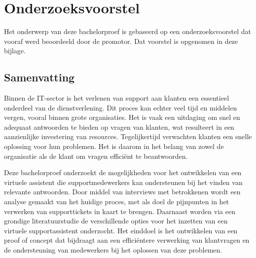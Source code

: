 \documentclass[dutch,dit,thesis]{hogentreport}
\begin{document}












\appendix

\chapter{Onderzoeksvoorstel}

Het onderwerp van deze bachelorproef is gebaseerd op een onderzoeksvoorstel dat vooraf werd beoordeeld door de promotor. Dat voorstel is opgenomen in deze bijlage.
 
\section*{Samenvatting}

 Binnen de IT-sector is het verlenen van support aan klanten een essentieel onderdeel van de dienstverlening. Dit proces kan echter veel tijd en middelen vergen, vooral binnen grote organisaties. Het is vaak een uitdaging om snel en adequaat antwoorden te bieden op vragen van klanten, wat resulteert in een aanzienlijke investering van resources. Tegelijkertijd verwachten klanten een snelle oplossing voor hun problemen. Het is daarom in het belang van zowel de organisatie als de klant om vragen efficiënt te beantwoorden.

Deze bachelorproef onderzoekt de mogelijkheden voor het ontwikkelen van een virtuele assistent die supportmedewerkers kan ondersteunen bij het vinden van relevante antwoorden. Door middel van interviews met betrokkenen wordt een analyse gemaakt van het huidige proces, met als doel de pijnpunten in het verwerken van supporttickets in kaart te brengen. Daarnaast worden via een grondige literatuurstudie de verschillende opties voor het inzetten van een virtuele supportassistent onderzocht. Het einddoel is het ontwikkelen van een proof of concept dat bijdraagt aan een efficiëntere verwerking van klantvragen en de ondersteuning van medewerkers bij het oplossen van deze problemen.
\end{document}
